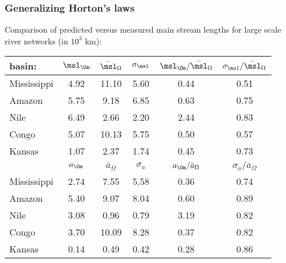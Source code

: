 \begin{frame}[label=]
  \frametitle{Generalizing Horton's laws}

  Comparison of predicted versus measured main stream lengths
  for large scale river networks (in $10^3$ km):
  \begin{center}
    \begin{tabular}{lccccc}
      \hline
      basin: &  $\msl_\Om$ & $\bar{\msl}_\Omega$ & 
      $\sigma_\msl$ & $\msl_\Om/\bar{\msl}_\Omega$ & $\sigma_\msl/\bar{\msl}_\Omega$ \\ \hline
      Mississippi & 4.92 & 11.10 & 5.60 & 0.44 & 0.51 \\
      Amazon &  5.75 & 9.18 & 6.85 & 0.63 & 0.75 \\
      Nile & 6.49 & 2.66 & 2.20 & 2.44 & 0.83 \\
      Congo & 5.07 & 10.13 & 5.75 & 0.50 & 0.57 \\ 
      Kansas & 1.07 & 2.37 & 1.74 & 0.45 & 0.73 \\ \hline\hline
      & $a_\Om$ & $\bar{a}_\Omega$ & $\sigma_a$ & $a_\Om/\bar{a}_\Omega$ & $\sigma_a/\bar{a}_\Omega$ \\ \hline
      Mississippi & 2.74 & 7.55 & 5.58 & 0.36 & 0.74 \\
      Amazon & 5.40 & 9.07 & 8.04 & 0.60 & 0.89 \\
      Nile & 3.08 & 0.96 & 0.79 & 3.19 & 0.82 \\
      Congo & 3.70 & 10.09 & 8.28 & 0.37 & 0.82 \\
      Kansas & 0.14 & 0.49 & 0.42 & 0.28 & 0.86 \\
    \end{tabular}
  \end{center}

\end{frame}




